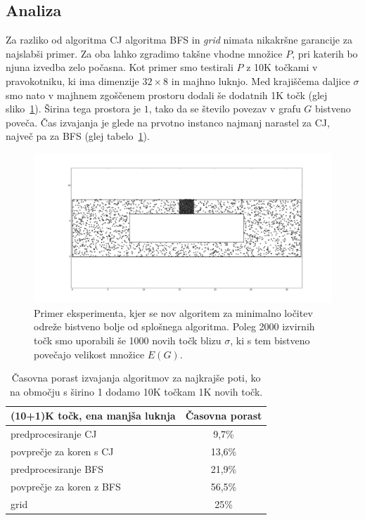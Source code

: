 \documentclass[a4paper, 12pt]{book}
\begin{document}
\subsection{Analiza}
\label{analiza}

Za razliko od algoritma CJ algoritma BFS in \textit{grid} nimata nikakršne garancije za najslabši primer. Za oba lahko zgradimo takšne vhodne množice $P$, pri katerih bo njuna izvedba zelo počasna. Kot primer smo testirali $P$ z 10K točkami v pravokotniku, ki ima dimenzije $32\times 8$ in majhno luknjo. Med krajiščema daljice $\sigma$ smo nato v majhnem zgoščenem prostoru dodali še dodatnih 1K točk (glej sliko~\ref{sep-stuffed}). Širina tega prostora je $1$, tako da se število povezav v grafu $G$ bistveno poveča. Čas izvajanja je glede na prvotno instanco najmanj narastel za CJ, največ pa za BFS (glej tabelo~\ref{table-increase}).

\begin{figure}[htp]
\centerline{\includegraphics[scale=0.3]{pics/32-1-5000-stuffed.png}}
\caption{Primer eksperimenta, kjer se nov algoritem za minimalno ločitev odreže bistveno bolje od splošnega algoritma. Poleg 2000 izvirnih točk smo uporabili še 1000 novih točk blizu $\sigma$, ki s tem bistveno povečajo velikost množice $E(G)$.}
\label{sep-stuffed}
\end{figure}

\begin{table}[htp]
\begin{center}
\begin{tabular}{l*{1}{c}}
(10+1)K točk, ena manjša luknja & \multicolumn{1}{c}{Časovna porast} \\
\hline
predprocesiranje CJ &	9,7\%		\\
povprečje za koren s CJ &	13,6\%	\\
predprocesiranje BFS & 21,9\%	\\
povprečje za koren z BFS &	56,5\% \\
grid &	25\%
\end{tabular}
\caption{Časovna porast izvajanja algoritmov za najkrajše poti, ko na območju s širino 1 dodamo 10K točkam 1K novih točk.}
\label{table-increase}
\end{center}
\end{table}
\end{document}
